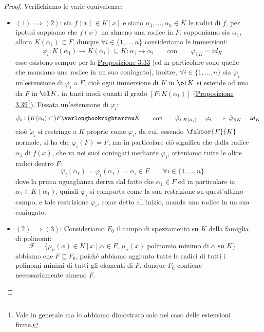 \documentclass[11pt]{scrartcl}
\begin{document}
\begin{proof}
    Verifichiamo le varie equivalenze:
    \begin{itemize}
        \item \underline{\textbf{$(1)\implies (2)$}}: sia $f(x) \in K[x]$ e siano $\alpha_1,\ldots,\alpha_n \in \overline K$ le radici di $f$, per ipotesi sappiamo che $f(x)$ ha almeno una radice in $F$, supponiamo sia $\alpha_1$, allora $K(\alpha_1) \subset F$, dunque
        $\forall i \in \{1,\ldots,n\}$ consideriamo le immersioni:
        \[ \varphi_i : K(\alpha_1) \longrightarrow K(\alpha_i) \subseteq \overline K : \alpha_1 \longmapsto \alpha_i \qquad \text{con} \qquad \varphi_{i|K} = id_K
            \]
        esse esistono sempre per la \hyperref[3.33]{Proposizione 3.33} (ed in particolare sono quelle che mandano una radice in un suo coniugato), inoltre, $\forall i \in \{1,\ldots,n\}$ sia $\widetilde{\varphi_i}$ un'estensione di $\varphi_i$ a $F$, cioè ogni immersione di $K$ in $\ol K$ si estende ad una da $F$ in $\ol K$,
        in tanti modi quanti il grado $[F : K(\alpha_1)]$ (\hyperref[3.39]{Proposizione 3.39}\footnote{Vale in generale ma lo abbiamo dimostrato solo nel caso delle estensioni finite.}). Fissata un'estensione di $\varphi_i$:
        \[ \widetilde{\varphi_i} : (K(\alpha_i) \subset)F \varlonghookrightarrow \overline K \qquad \text{con} \qquad \widetilde{\varphi}_{i|K(\alpha_i)} = \varphi_i \implies \widetilde{\varphi}_{i|K} = id_K
            \]
        cioè $\widetilde{\varphi}_i$ si restringe a $K$ proprio come $\varphi_i$, da cui, essendo $\faktor{F}{K}$ normale, si ha che $\widetilde{\varphi}_i(F) = F$, ma in particolare ciò significa che
        dalla radice $\alpha_1$ di $f(x)$, che va nei suoi coniugati mediante $\varphi_i$, otteniamo tutte le altre radici dentro $F$:
        \[ \widetilde{\varphi}_i(\alpha_1) = \varphi_i(\alpha_1) = \alpha_i \in F \qquad \forall i \in \{1,\ldots,n\}
            \]
        dove la prima uguaglianza deriva dal fatto che $\alpha_1 \in F$ ed in particolare in $\alpha_1 \in K(\alpha_1)$, quindi $\widetilde{\varphi_i}$ si comporta come la sua restrizione su quest'ultimo campo, e tale restrizione $\varphi_i$, come detto all'inizio, manda una radice in un suo coniugato.
        \item \underline{\textbf{$(2)\implies (3)$}}: Consideriamo $F_0$ il campo di spezzamento su $K$ della famiglia di polinomi:
        \[ \mathcal{F} = \{\mu_\alpha(x) \in K[x] | \alpha \in F, \, \text{$\mu_\alpha(x)$ polinomio minimo di $\alpha$ su $K$}\}
            \]
        abbiamo che $F \subseteq F_0$, poiché abbiamo aggiunto tutte le radici di tutti i polinomi minimi di tutti gli elementi di $F$, dunque $F_0$ contiene necessariamente almeno $F$.

\end{itemize}
\end{proof}
\end{document}
